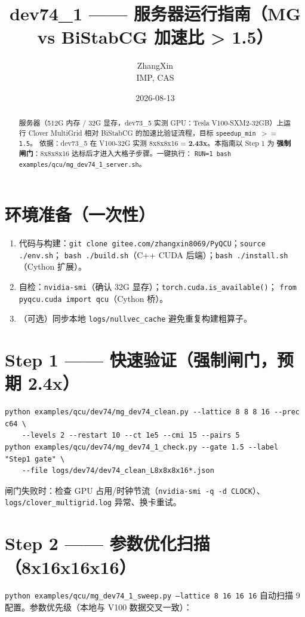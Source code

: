 \documentclass[11pt,a4paper]{article}
\title{\textbf{dev74\_1 —— 服务器运行指南（MG vs BiStabCG 加速比 > 1.5）}}
\author{ZhangXin \\ IMP, CAS}
\date{2026-08-13}
\begin{document}
\maketitle

\begin{abstract}
服务器（512G 内存 / 32G 显存，dev73\_5 实测 GPU：Tesla V100-SXM2-32GB）上运行
Clover MultiGrid 相对 BiStabCG 的加速比验证流程，目标 \texttt{speedup\_min $>=$ 1.5}。
依据：dev73\_5 在 V100-32G 实测 8x8x8x16 = \textbf{2.43x}。本指南以 Step 1 为
\textbf{强制闸门}：8x8x8x16 达标后才进入大格子步骤。一键执行：
\texttt{RUN=1 bash examples/qcu/mg\_dev74\_1\_server.sh}。
\end{abstract}

\section{环境准备（一次性）}
\begin{enumerate}
  \item 代码与构建：\texttt{git clone gitee.com/zhangxin8069/PyQCU}；\texttt{source ./env.sh}；
    \texttt{bash ./build.sh}（C++ CUDA 后端）；\texttt{bash ./install.sh}（Cython 扩展）。
  \item 自检：\texttt{nvidia-smi}（确认 32G 显存）；\texttt{torch.cuda.is\_available()}；
    \texttt{from pyqcu.cuda import qcu}（Cython 桥）。
  \item （可选）同步本地 \texttt{logs/nullvec\_cache} 避免重复构建粗算子。
\end{enumerate}

\section{Step 1 —— 快速验证（强制闸门，预期 2.4x）}
\begin{verbatim}
python examples/qcu/dev74/mg_dev74_clean.py --lattice 8 8 8 16 --prec c64 \
    --levels 2 --restart 10 --ct 1e5 --cmi 15 --pairs 5
python examples/qcu/dev74/mg_dev74_1_check.py --gate 1.5 --label "Step1 gate" \
    --file logs/dev74/dev74_clean_L8x8x8x16*.json
\end{verbatim}
闸门失败时：检查 GPU 占用/时钟节流（\texttt{nvidia-smi -q -d CLOCK}）、
\texttt{logs/clover\_multigrid.log} 异常、换卡重试。

\section{Step 2 —— 参数优化扫描（8x16x16x16）}
\texttt{python examples/qcu/mg\_dev74\_1\_sweep.py --lattice 8 16 16 16}
自动扫描 9 配置。参数优先级（本地与 V100 数据交叉一致）：
\end{document}

